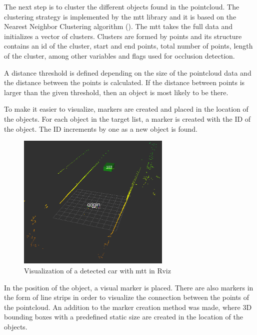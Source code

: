 The next step is to cluster the different objects found in the pointcloud. The clustering strategy is implemented by the \gls{mtt} library and it is based on the Nearest Neighbor Clustering algorithm (\cite{Yu2018}). The \gls{mtt} takes the full data and initializes a vector of clusters. Clusters are formed by points and its structure contains an id of the cluster, start and end points, total number of points, length of the cluster, among other variables and flags used for occlusion detection.

A distance threshold is defined depending on the size of the pointcloud data and the distance between the points is calculated. If the distance between points is larger than the given threshold, then an object is most likely to be there.

To make it easier to visualize, markers are created and placed in the location of the objects. For each object in the target list, a marker is created with the ID of the object. The ID increments by one as a new object is found. 

\begin{figure}[htp]
	
	\centering
	\includegraphics[width=0.65\textwidth]{caplabel/imgs/rviz1.png}
	
	\caption{Visualization of a detected car with \gls{mtt} in Rviz}
	\label{fig:rviz1}
	
\end{figure}

In the position of the object, a visual marker is placed. There are also markers in the form of line strips in order to visualize the connection between the points of the pointcloud. An addition to the marker creation method was made, where 3D bounding boxes with a predefined static size are created in the location of the objects.

